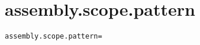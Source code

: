 \section{assembly.scope.pattern}
\label{configuration:AssemblyScopePattern}
\AvailableInCsharpOnly{\TODO}
\begin{lstlisting}[style=Props,caption={Usage example for \textit{assembly.scope.pattern}}]
assembly.scope.pattern=
\end{lstlisting}